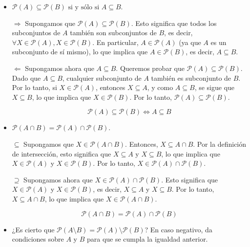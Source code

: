 \begin{solution}
    \begin{itemize}
        \item $\mathscr{P}(A) \subseteq \mathscr{P}(B) \text{ si y sólo si } A \subseteq B$.

        \(\Rightarrow\) Supongamos que \( \mathscr{P}(A) \subseteq \mathscr{P}(B) \). Esto significa que todos los subconjuntos de \( A \) también son subconjuntos de \( B \), es decir, \( \forall X \in \mathscr{P}(A), X \in \mathscr{P}(B) \). En particular, \( A \in \mathscr{P}(A) \) (ya que \( A \) es un subconjunto de sí mismo), lo que implica que \( A \in \mathscr{P}(B) \), es decir, \( A \subseteq B \).

        \(\Leftarrow\) Supongamos ahora que \( A \subseteq B \). Queremos probar que \( \mathscr{P}(A) \subseteq \mathscr{P}(B) \). Dado que \( A \subseteq B \), cualquier subconjunto de \( A \) también es subconjunto de \( B \). Por lo tanto, si \( X \in \mathscr{P}(A) \), entonces \( X \subseteq A \), y como \( A \subseteq B \), se sigue que \( X \subseteq B \), lo que implica que \( X \in \mathscr{P}(B) \). Por lo tanto, \( \mathscr{P}(A) \subseteq \mathscr{P}(B) \).
        
        \[
        \boxed{\mathscr{P}(A) \subseteq \mathscr{P}(B) \iff A \subseteq B}
        \]
        
        \item $\mathscr{P}(A \cap B) = \mathscr{P}(A) \cap \mathscr{P}(B)$.

        \(\subseteq\) Supongamos que \( X \in \mathscr{P}(A \cap B) \). Entonces, \( X \subseteq A \cap B \). Por la definición de intersección, esto significa que \( X \subseteq A \) y \( X \subseteq B \), lo que implica que \( X \in \mathscr{P}(A) \) y \( X \in \mathscr{P}(B) \). Por lo tanto, \( X \in \mathscr{P}(A) \cap \mathscr{P}(B) \).

        \(\supseteq\) Supongamos ahora que \( X \in \mathscr{P}(A) \cap \mathscr{P}(B) \). Esto significa que \( X \in \mathscr{P}(A) \) y \( X \in \mathscr{P}(B) \), es decir, \( X \subseteq A \) y \( X \subseteq B \). Por lo tanto, \( X \subseteq A \cap B \), lo que implica que \( X \in \mathscr{P}(A \cap B) \).
        
        \[
        \boxed{\mathscr{P}(A \cap B) = \mathscr{P}(A) \cap \mathscr{P}(B)}
        \]
        
        \item ¿Es cierto que \( \mathscr{P}(A \setminus B) = \mathscr{P}(A) \setminus \mathscr{P}(B) \)? En caso negativo, da condiciones sobre \( A \) y \( B \) para que se cumpla la igualdad anterior.


\end{itemize}
\end{solution}
